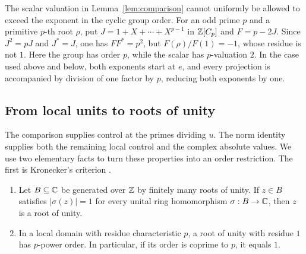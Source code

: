 \begin{remark}\label{rem:exponent}
The scalar valuation in Lemma~\ref{lem:comparison} cannot uniformly
be allowed to exceed the exponent in the cyclic group order. For an
odd prime \(p\) and a primitive \(p\)-th root \(\rho\), put
\(J=1+X+\cdots+X^{p-1}\) in \(\mathbb Z[C_p]\) and \(F=p-2J\).
Since \(J^2=pJ\) and \(J^*=J\), one has \(FF^*=p^2\),
but \(F(\rho)/F(1)=-1\), whose residue is not \(1\).
Here the group has order \(p\), while the scalar has \(p\)-valuation
\(2\). In the case used above and below, both exponents start at
\(e\), and every projection is accompanied by division of one factor
by \(p\), reducing both exponents by one.
\end{remark}

\subsection{From local units to roots of unity}

The comparison supplies control at the primes dividing \(u\).
The norm identity supplies both the remaining local control and the
complex absolute values. We use two elementary facts to turn these
properties into an order restriction. The first is Kronecker's
criterion \cite[Statement~I]{Kronecker1857}.

\begin{lemma}\label{lem:torsion}
\leavevmode
\begin{enumerate}[label=\textup{(\roman*)}]
\item Let \(B\subseteq\mathbb C\) be generated over \(\mathbb Z\) by finitely many
roots of unity. If \(z\in B\) satisfies \(|\sigma(z)|=1\) for every
unital ring homomorphism \(\sigma:B\to\mathbb C\), then \(z\) is a root of unity.
\item In a local domain with residue characteristic \(p\), a root of
unity with residue \(1\) has \(p\)-power order. In particular, if its
order is coprime to \(p\), it equals \(1\).
\end{enumerate}
\end{lemma}

